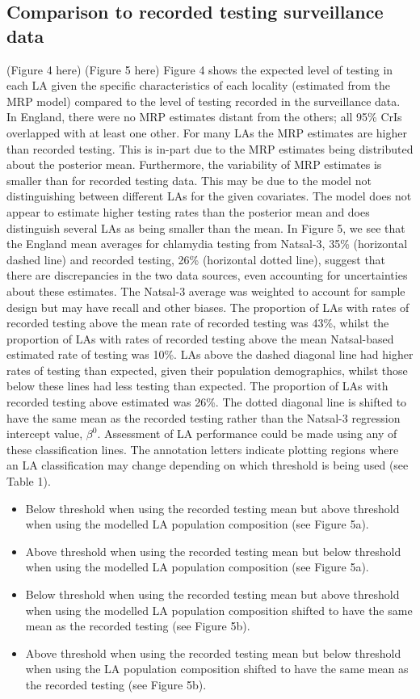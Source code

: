 \documentclass[12pt]{article}
\begin{document}
\subsection*{Comparison to recorded testing surveillance data}
 (Figure 4 here)
(Figure 5 here)
Figure 4 shows the expected level of testing in each LA given the specific characteristics of each locality (estimated from the MRP model) compared to the level of testing recorded in the surveillance data. In England, there were no MRP estimates distant from the others; all 95\% CrIs overlapped with at least one other. For many LAs the MRP estimates are higher than recorded testing. This is in-part due to the MRP estimates being distributed about the posterior mean. Furthermore, the variability of MRP estimates is smaller than for recorded testing data. This may be due to the model not distinguishing between different LAs for the given covariates. The model does not appear to estimate higher testing rates than the posterior mean and does distinguish several LAs as being smaller than the mean. In Figure 5, we see that the England mean averages for chlamydia testing from Natsal-3, 35\% (horizontal dashed line) and recorded testing, 26\% (horizontal dotted line), suggest that there are discrepancies in the two data sources, even accounting for uncertainties about these estimates. The Natsal-3 average was weighted to account for sample design but may have recall and other biases. The proportion of LAs with rates of recorded testing above the mean rate of recorded testing was 43\%, whilst the proportion of LAs with rates of recorded testing above the mean Natsal-based estimated rate of testing was 10\%. LAs above the dashed diagonal line had higher rates of testing than expected, given their population demographics, whilst those below these lines had less testing than expected. The proportion of LAs with recorded testing above estimated was 26\%. 
The dotted diagonal line is shifted to have the same mean as the recorded testing rather than the Natsal-3 regression intercept value, $\beta^0$. Assessment of LA performance could be made using any of these classification lines. 
The annotation letters indicate plotting regions where an LA classification may change depending on which threshold is being used (see Table 1).
\begin{itemize}
\item	Below threshold when using the recorded testing mean but above threshold when using the modelled LA population composition (see Figure 5a).
\item	Above threshold when using the recorded testing mean but below threshold when using the modelled LA population composition (see Figure 5a).
\item	Below threshold when using the recorded testing mean but above threshold when using the modelled LA population composition shifted to have the same mean as the recorded testing (see Figure 5b).
\item	Above threshold when using the recorded testing mean but below threshold when using the LA population composition shifted to have the same mean as the recorded testing (see Figure 5b).
\end{itemize}
\end{document}
